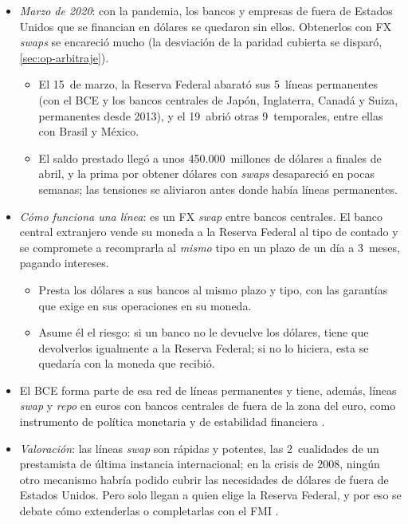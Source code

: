 \documentclass[11pt]{article}
\begin{document}
\begin{itemize}
\begin{enumerate}
  \item las líneas \emph{swap} con la Reserva Federal.
  \end{enumerate}
\item \emph{Marzo de 2020}: con la pandemia, los bancos y empresas de fuera de Estados Unidos que se financian en dólares se quedaron sin ellos. Obtenerlos con FX \emph{swaps} se encareció mucho (la desviación de la paridad cubierta se disparó, \ref{sec:op-arbitraje})\nocite{ErenSchrimpfSushko2020Dollar}.
  \begin{itemize}
  \item El 15~de marzo, la Reserva Federal abarató sus 5~líneas permanentes (con el BCE y los bancos centrales de Japón, Inglaterra, Canadá y Suiza, permanentes desde 2013)\nocite{Fed2020SwapsCoordinada}, y el 19~abrió otras 9~temporales, entre ellas con Brasil y México\nocite{Fed2020Swaps}.
  \item El saldo prestado llegó a unos 450.000~millones de dólares a finales de abril, y la prima por obtener dólares con \emph{swaps} desapareció en pocas semanas; las tensiones se aliviaron antes donde había líneas permanentes\nocite{GarciaEscuderoSanchez2020Swaps,ErenSchrimpfSushko2020Dollar}.
  \end{itemize}
\item \emph{Cómo funciona una línea}: es un FX \emph{swap} entre bancos centrales. El banco central extranjero vende su moneda a la Reserva Federal al tipo de contado y se compromete a recomprarla al \emph{mismo} tipo en un plazo de un día a 3~meses, pagando intereses\nocite{Fed2023LiquiditySwaps}.
  \begin{itemize}
  \item Presta los dólares a sus bancos al mismo plazo y tipo, con las garantías que exige en sus operaciones en su moneda.
  \item Asume él el riesgo: si un banco no le devuelve los dólares, tiene que devolverlos igualmente a la Reserva Federal; si no lo hiciera, esta se quedaría con la moneda que recibió.
  \end{itemize}
\item El BCE forma parte de esa red de líneas permanentes y tiene, además, líneas \emph{swap} y \emph{repo} en euros con bancos centrales de fuera de la zona del euro, como instrumento de política monetaria y de estabilidad financiera\nocite{BCE2026LineasSwap} .
\item \emph{Valoración}: las líneas \emph{swap} son rápidas y potentes, las 2~cualidades de un prestamista de última instancia internacional; en la crisis de 2008, ningún otro mecanismo habría podido cubrir las necesidades de dólares de fuera de Estados Unidos. Pero solo llegan a quien elige la Reserva Federal, y por eso se debate cómo extenderlas o completarlas con el FMI\nocite{GarciaEscuderoSanchez2020Swaps} .
\end{itemize}
\end{document}
